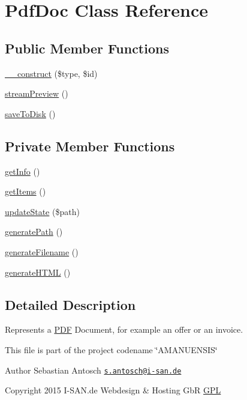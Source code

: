\hypertarget{class_pdf_doc}{}\section{Pdf\+Doc Class Reference}
\label{class_pdf_doc}
\subsection*{Public Member Functions}
\begin{DoxyCompactItemize}
\item 
\hyperlink{class_pdf_doc_ab838a22786c540b6b0dd5eb7b4f16451}{\+\_\+\+\_\+construct} (\$type, \$id)
\item 
\hyperlink{class_pdf_doc_ac577e3777381a2b1616704cbefcec054}{stream\+Preview} ()
\item 
\hyperlink{class_pdf_doc_a980f4ff9366e30bbc593223f606a6ec1}{save\+To\+Disk} ()
\end{DoxyCompactItemize}
\subsection*{Private Member Functions}
\begin{DoxyCompactItemize}
\item 
\hyperlink{class_pdf_doc_a164026f74736817927e1cacd282a2e28}{get\+Info} ()
\item 
\hyperlink{class_pdf_doc_ab20ac3660e2d867b235b004bd3950ec3}{get\+Items} ()
\item 
\hyperlink{class_pdf_doc_a8e1c644fb3127a75be9e7b36e4ef6e79}{update\+State} (\$path)
\item 
\hyperlink{class_pdf_doc_adb5455ba3678cc7d0333ba3e6c1f5e9b}{generate\+Path} ()
\item 
\hyperlink{class_pdf_doc_a8bad07be942d56e97c7a6cf4bd17e02b}{generate\+Filename} ()
\item 
\hyperlink{class_pdf_doc_a423e6fdd1402abf321e7e93a5d2d2f7b}{generate\+H\+T\+M\+L} ()
\end{DoxyCompactItemize}


\subsection{Detailed Description}
Represents a \hyperlink{class_p_d_f}{P\+D\+F} Document, for example an offer or an invoice.

This file is part of the project codename \char`\"{}\+A\+M\+A\+N\+U\+E\+N\+S\+I\+S\char`\"{}

\begin{DoxyAuthor}{Author}
Sebastian Antosch \href{mailto:s.antosch@i-san.de}{\tt s.\+antosch@i-\/san.\+de} 
\end{DoxyAuthor}
\begin{DoxyCopyright}{Copyright}
2015 I-\/\+S\+A\+N.\+de Webdesign \& Hosting Gb\+R \hyperlink{}{G\+P\+L }
\end{DoxyCopyright}


